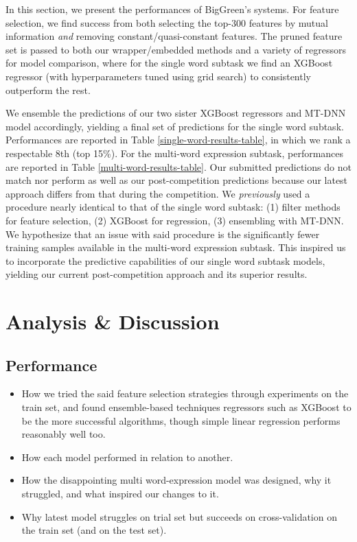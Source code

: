 \documentclass[11pt,a4paper]{article}
\begin{document}
In this section, we present the performances of BigGreen's systems. For feature selection, we find success from both selecting the top-300 features by mutual information \textit{and} removing constant/quasi-constant features. The pruned feature set is passed to both our wrapper/embedded methods and a variety of regressors for model comparison, where for the single word subtask we find an XGBoost regressor \citep{DBLP:journals/corr/ChenG16} (with hyperparameters tuned using grid search) to consistently outperform the rest.

We ensemble the predictions of our two sister XGBoost regressors and MT-DNN model accordingly, yielding a final set of predictions for the single word subtask. Performances are reported in Table \ref{single-word-results-table}, in which we rank a respectable 8th (top 15\%). For the multi-word expression subtask, performances are reported in Table \ref{multi-word-results-table}. Our submitted predictions do not match nor perform as well as our post-competition predictions because our latest approach differs from that during the competition. We \textit{previously} used a procedure nearly identical to that of the single word subtask: (1) filter methods for feature selection, (2) XGBoost for regression, (3) ensembling with MT-DNN. We hypothesize that an issue with said procedure is the significantly fewer training samples available in the multi-word expression subtask. This inspired us to incorporate the predictive capabilities of our single word subtask models, yielding our current post-competition approach and its superior results.

\section{Analysis \& Discussion}

\subsection{Performance}

\begin{itemize}
  \item How we tried the said feature selection strategies through experiments on the train set, and found ensemble-based techniques regressors such as XGBoost to be the more successful algorithms, though simple linear regression performs reasonably well too.
  \item How each model performed in relation to another.
  \item How the disappointing multi word-expression model was designed, why it struggled, and what inspired our changes to it.
  \item Why latest model struggles on trial set but succeeds on cross-validation on the train set (and on the test set).
\end{itemize}
\end{document}
